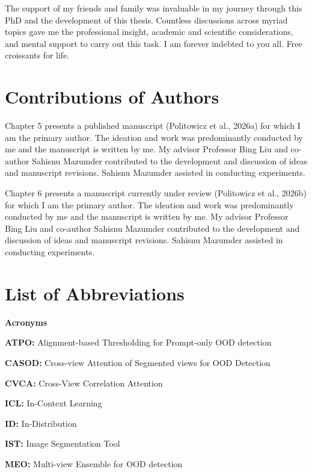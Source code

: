 \documentclass[12pt,reqno,oneside]{amsbook}
\theoremstyle{definition}
\newcommand{\?}{\stackrel{?}{=}}
\def\initials#1{
   \par\vspace{0pt}
   \leftline{\hskip 5.5in #1 \hfil}}
\begin{document}
The support of my friends and family was invaluable in my journey through this PhD and the development of this thesis. Countless discussions across myriad topics gave me the professional insight, academic and scientific considerations, and mental support to carry out this task. I am forever indebted to you all. Free croissants for life.

\initials{ALP}

\chapter*{Contributions of Authors}

Chapter 5 presents a published manuscript (Politowicz et al., 2026a) for which I am the primary author. The ideation and work was predominantly conducted by me and the manuscript is written by me. My advisor Professor Bing Liu and co-author Sahisnu Mazumder contributed to the development and discussion of ideas and manuscript revisions. Sahisnu Mazumder assisted in conducting experiments.

Chapter 6 presents a manuscript currently under review (Politowicz et al., 2026b) for which I am the primary author. The ideation and work was predominantly conducted by me and the manuscript is written by me. My advisor Professor Bing Liu and co-author Sahisnu Mazumder contributed to the development and discussion of ideas and manuscript revisions. Sahisnu Mazumder assisted in conducting experiments.

\tableofcontents
\listoffigures
\listoftables

\chapter*{List of Abbreviations}
\centerline{\textbf{Acronyms}}

\textbf{ATPO:} Alignment-based Thresholding for Prompt-only OOD detection

\textbf{CASOD:} Cross-view Attention of Segmented views for OOD Detection

\textbf{CVCA:} Cross-View Correlation Attention

\textbf{ICL:} In-Context Learning

\textbf{ID:} In-Distribution

\textbf{IST:} Image Segmentation Tool

\textbf{MEO:} Multi-view Ensemble for OOD detection
\end{document}
